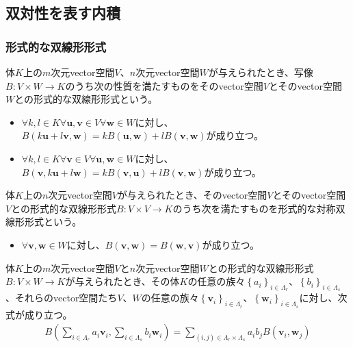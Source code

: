 \documentclass[dvipdfmx]{jsarticle}
\begin{document}
\subsection{双対性を表す内積}%
\subsubsection{形式的な双線形形式}%
\begin{axs}
体$K$上の$m$次元vector空間$V$、$n$次元vector空間$W$が与えられたとき、写像$B:V \times W \rightarrow K$のうち次の性質を満たすものをそのvector空間$V$とそのvector空間$W$との形式的な双線形形式という。
\begin{itemize}
\item
  $\forall k,l \in K\forall\mathbf{u},\mathbf{v} \in V\forall\mathbf{w} \in W$に対し、$B\left( k\mathbf{u} + l\mathbf{v},\mathbf{w} \right) = kB\left( \mathbf{u},\mathbf{w} \right) + lB\left( \mathbf{v},\mathbf{w} \right)$が成り立つ。
\item
  $\forall k,l \in K\forall\mathbf{v} \in V\forall\mathbf{u},\mathbf{w} \in W$に対し、$B\left( \mathbf{v},k\mathbf{u} + l\mathbf{w} \right) = kB\left( \mathbf{v},\mathbf{u} \right) + lB\left( \mathbf{v},\mathbf{w} \right)$が成り立つ。
\end{itemize}
\end{axs}
\begin{dfn}
体$K$上の$n$次元vector空間$V$が与えられたとき、そのvector空間$V$とそのvector空間$V$との形式的な双線形形式$B:V \times V \rightarrow K$のうち次を満たすものを形式的な対称双線形形式という。
\begin{itemize}
\item
  $\forall\mathbf{v},\mathbf{w} \in W$に対し、$B\left( \mathbf{v},\mathbf{w} \right) = B\left( \mathbf{w},\mathbf{v} \right)$が成り立つ。
\end{itemize}
\end{dfn}
\begin{thm}\label{2.4.3.1}
体$K$上の$m$次元vector空間$V$と$n$次元vector空間$W$との形式的な双線形形式$B:V \times W \rightarrow K$が与えられたとき、その体$K$の任意の族々$\left\{ a_{i} \right\}_{i \in \varLambda_{r}}$、$\left\{ b_{i} \right\}_{i \in \varLambda_{s}}$、それらのvector空間たち$V$、$W$の任意の族々$\left\{ \mathbf{v}_{i} \right\}_{i \in \varLambda_{r}}$、$\left\{ \mathbf{w}_{i} \right\}_{i \in \varLambda_{s}}$に対し、次式が成り立つ。
\begin{align*}
B\left( \sum_{i \in \varLambda_{r}} {a_{i}\mathbf{v}_{i}},\sum_{i \in \varLambda_{s}} {b_{i}\mathbf{w}_{i}} \right) = \sum_{(i,j) \in \varLambda_{r} \times \varLambda_{s}} {a_{i}b_{j}B\left( \mathbf{v}_{i},\mathbf{w}_{j} \right)}
\end{align*}
\end{thm}
\end{document}
